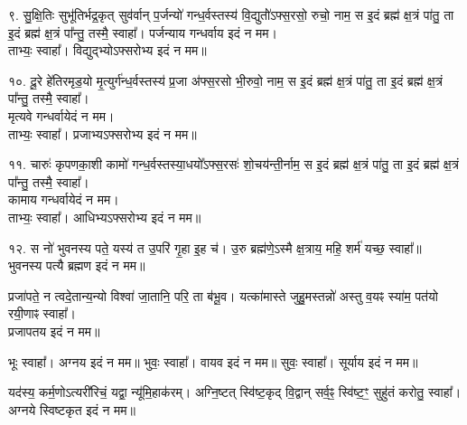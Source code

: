 ९. सु॒क्षि॒तिः सुभू॑तिर्भद्र॒कृत् सुव॑र्वान् प॒र्जन्यो॑ गन्ध॒र्वस्तस्य॑ वि॒द्युतो॑॑ऽफ्स॒रसो॒ रुचो॒ नाम॒ स इ॒दं ब्रह्म॑ क्ष॒त्रं पा॑तु॒ ता इ॒दं ब्रह्म॑ क्ष॒त्रं पा᳚न्तु॒ तस्मै॒ स्वाहा᳚। पर्जन्याय गन्धर्वाय इदं न मम।\\
ताभ्यः॒ स्वाहा᳚। विद्युद्भ्योऽफ्सरोभ्य इदं न मम॥

१०. दू॒रे हे॑तिरमृड॒यो मृ॒त्युर्ग॑न्ध॒र्वस्तस्य॑ प्र॒जा अ॑फ्स॒रसो भी॒रुवो॒ नाम॒ स इ॒दं ब्रह्म॑ क्ष॒त्रं पा॑तु॒ ता इ॒दं ब्रह्म॑ क्ष॒त्रं पा᳚न्तु॒ तस्मै॒ स्वाहा᳚।\\
मृत्यवे गन्धर्वायेदं न मम।\\
ताभ्यः॒ स्वाहा᳚। प्रजाभ्यऽफ्सरोभ्य इदं न मम॥

११. चारुः॑ कृपणका॒शी कामो॑ गन्ध॒र्वस्तस्या॒धयो᳚ऽफ्स॒रसः॑ शो॒चय॑न्ती॒र्नाम॒ स इ॒दं ब्रह्म॑ क्ष॒त्रं पा॑तु॒ ता इ॒दं ब्रह्म॑ क्ष॒त्रं पा᳚न्तु॒ तस्मै॒ स्वाहा᳚।\\
कामाय गन्धर्वायेदं न मम।\\
ताभ्यः॒ स्वाहा᳚। आधिभ्यऽफ्सरोभ्य इदं न मम॥

१२. स नो॑ भुवनस्य पते॒ यस्य॑ त उ॒परि॑ गृ॒हा इ॒ह च॑।
उ॒रु ब्रह्म॑णे॒ऽस्मै क्ष॒त्राय॒ महि॒ शर्म॑ यच्छ॒ स्वाहा᳚॥\\
भुवनस्य पत्यै ब्रह्मण इदं न मम॥

प्रजा॑पते॒ न त्वदे॒तान्य॒न्यो विश्वा॑ जा॒तानि॒ परि॒ ता ब॑भू॒व।
यत्का॑मास्ते जुहु॒मस्तन्नो॑ अस्तु व॒यꣴ स्या॑म॒ पत॑यो रयी॒णाꣴ स्वाहा᳚।\\
प्रजापतय इदं न मम॥

भूः स्वाहा᳚। अग्नय इदं न मम॥
भुवः॒ स्वाहा᳚। वायव इदं न मम॥
सुवः॒ स्वाहा᳚। सूर्याय इदं न मम॥

यद॑स्य॒ कर्म॒णोऽत्यरी॑रिचं॒ यद्वा॒ न्यू॑मि॒हाक॑रम्। अग्नि॒ष्टत् स्वि॑ष्ट॒कृद् वि॒द्वान् सर्व॒ꣴ॒ स्वि॑ष्ट॒ꣳ॒ सुहु॑तं करोतु॒ स्वाहा᳚। अग्नये स्विष्टकृत इदं न मम॥